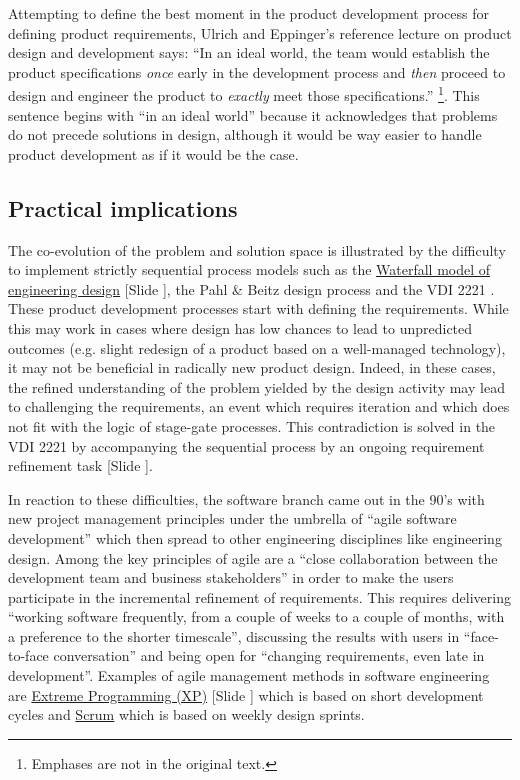 \documentclass{article}
\newcounter{slide}
\begin{document}
Attempting to define the best moment in the product development process for defining product requirements, Ulrich and Eppinger's reference lecture on product design and development says: ``In an ideal world, the team would establish the product specifications \emph{once} early in the development process and \emph{then} proceed to design and engineer the product to \emph{exactly} meet those specifications.'' \cite[p. 73]{ulrichProductDesignDevelopment2011}\footnote{Emphases are not in the original text.}. This sentence begins with ``in an ideal world'' because it acknowledges that problems do not precede solutions in design, although it would be way easier to handle product development as if it would be the case. 

\subsection{Practical implications}
\label{sec:practicalimplicationstwo}

The co-evolution of the problem and solution space is illustrated by the difficulty to implement strictly sequential process models such as the \href{https://en.wikipedia.org/wiki/Waterfall\_model}{Waterfall model of engineering design} {\color{blue}[Slide ]}, the Pahl \& Beitz design process \cite{pahlEngineeringDesignSystematic2007} and the VDI 2221 \cite{vdi1993design}. These product development processes start with defining the requirements. While this may work in cases where design has low chances to lead to unpredicted outcomes (e.g. slight redesign of a product based on a well-managed technology), it may not be beneficial in radically new product design. Indeed, in these cases, the refined understanding of the problem yielded by the design activity may lead to challenging the requirements, an event which requires iteration and which does not fit with the logic of stage-gate processes. This contradiction is solved in the VDI 2221 by accompanying the sequential process by an ongoing requirement refinement task {\color{blue}[Slide ]}\cite{vdi1993design}.

In reaction to these difficulties, the software branch came out in the 90's with new project management principles under the umbrella of ``agile software development'' \cite{beck2001manifesto} which then spread to other engineering disciplines like engineering design. Among the key principles of agile are a ``close collaboration between the development team and business stakeholders'' in order to make the users participate in the incremental refinement of requirements. This requires delivering ``working software frequently, from a couple of weeks to a couple of months, with a preference to the shorter timescale'', discussing the results with users in ``face-to-face conversation'' and being open for ``changing requirements, even late in development''. Examples of agile management methods in software engineering are \href{https://en.wikipedia.org/wiki/Extreme_programming}{Extreme Programming (XP)} {\color{blue}[Slide ]} which is based on short development cycles and \href{https://en.wikipedia.org/wiki/Scrum_(software_development)}{Scrum} which is based on weekly design sprints.
\end{document}
